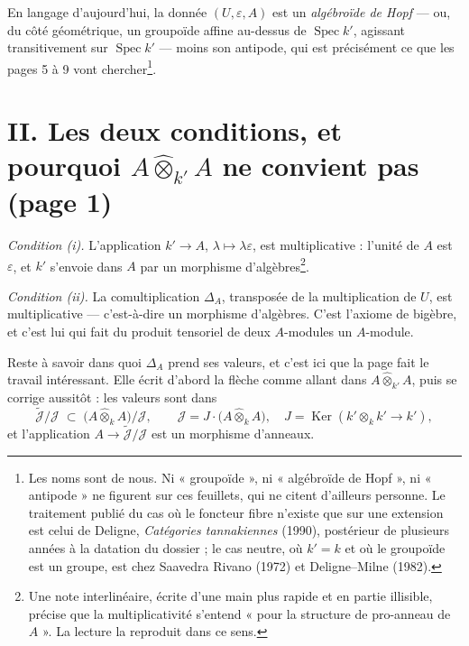 \documentclass[11pt,a4paper]{article}
\begin{document}
En langage d'aujourd'hui, la donnée $(U, \varepsilon, A)$ est un
\emph{algébroïde de Hopf} — ou, du côté géométrique, un groupoïde affine
au-dessus de $\operatorname{Spec} k'$, agissant transitivement sur
$\operatorname{Spec} k'$ — moins son antipode, qui est précisément ce que les
pages 5 à 9 vont chercher\footnote{Les noms sont de nous. Ni « groupoïde », ni
« algébroïde de Hopf », ni « antipode » ne figurent sur ces feuillets, qui ne
citent d'ailleurs personne. Le traitement publié du cas où le foncteur fibre
n'existe que sur une extension est celui de Deligne, \emph{Catégories
tannakiennes} (1990), postérieur de plusieurs années à la datation du dossier ;
le cas neutre, où $k' = k$ et où le groupoïde est un groupe, est chez Saavedra
Rivano (1972) et Deligne--Milne (1982).}.

\section*{II. Les deux conditions, et pourquoi $A \mathbin{\hat{\otimes}}_{k'} A$ ne convient pas (page 1)}

\emph{Condition (i).} L'application $k' \to A$, $\lambda \mapsto
\lambda\varepsilon$, est multiplicative : l'unité de $A$ est $\varepsilon$, et
$k'$ s'envoie dans $A$ par un morphisme d'algèbres\footnote{Une note
interlinéaire, écrite d'une main plus rapide et en partie illisible, précise
que la multiplicativité s'entend « pour la structure de pro-anneau de $A$ ». La
lecture la reproduit dans ce sens.}.

\emph{Condition (ii).} La comultiplication $\Delta_{A}$, transposée de la
multiplication de $U$, est multiplicative — c'est-à-dire un morphisme
d'algèbres. C'est l'axiome de bigèbre, et c'est lui qui fait du produit
tensoriel de deux $A$-modules un $A$-module.

Reste à savoir dans quoi $\Delta_{A}$ prend ses valeurs, et c'est ici que la
page fait le travail intéressant. Elle écrit d'abord la flèche comme allant
dans $A \mathbin{\hat{\otimes}}_{k'} A$, puis se corrige aussitôt : les valeurs
sont dans
\[
\widetilde{\mathcal{J}}/\mathcal{J} \;\subset\;
\bigl(A \mathbin{\hat{\otimes}}_{k} A\bigr)\big/\mathcal{J},
\qquad
\mathcal{J} = J\cdot\bigl(A \mathbin{\hat{\otimes}}_{k} A\bigr),
\quad
J = \operatorname{Ker}(k' \otimes_{k} k' \to k'),
\]
et l'application $A \to \widetilde{\mathcal{J}}/\mathcal{J}$ est un morphisme
d'anneaux.
\end{document}
